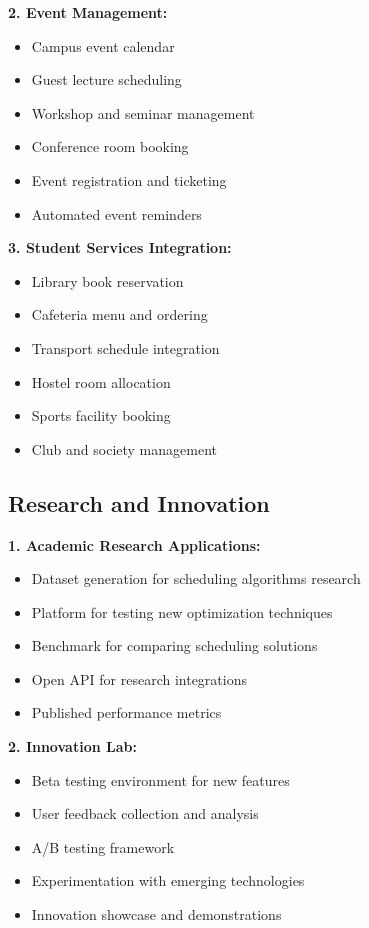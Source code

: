 \textbf{2. Event Management:}
\begin{itemize}
    \item Campus event calendar
    \item Guest lecture scheduling
    \item Workshop and seminar management
    \item Conference room booking
    \item Event registration and ticketing
    \item Automated event reminders
\end{itemize}

\textbf{3. Student Services Integration:}
\begin{itemize}
    \item Library book reservation
    \item Cafeteria menu and ordering
    \item Transport schedule integration
    \item Hostel room allocation
    \item Sports facility booking
    \item Club and society management
\end{itemize}

\subsection{Research and Innovation}

\textbf{1. Academic Research Applications:}
\begin{itemize}
    \item Dataset generation for scheduling algorithms research
    \item Platform for testing new optimization techniques
    \item Benchmark for comparing scheduling solutions
    \item Open API for research integrations
    \item Published performance metrics
\end{itemize}

\textbf{2. Innovation Lab:}
\begin{itemize}
    \item Beta testing environment for new features
    \item User feedback collection and analysis
    \item A/B testing framework
    \item Experimentation with emerging technologies
    \item Innovation showcase and demonstrations
\end{itemize}

